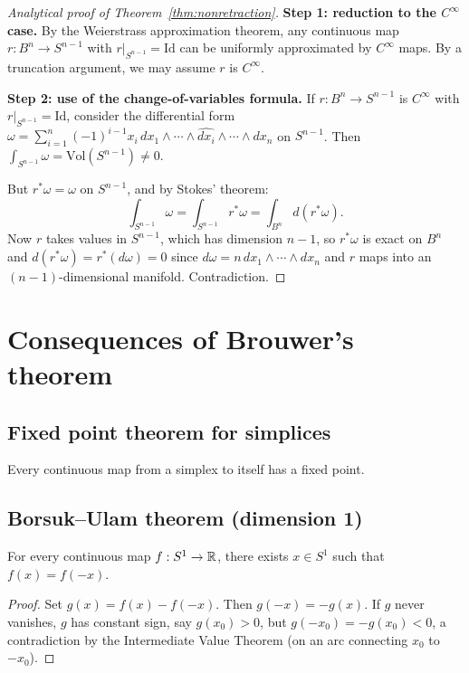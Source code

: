 \begin{proof}[Analytical proof of Theorem~\ref{thm:nonretraction}]
\textbf{Step 1: reduction to the $C^\infty$ case.}
By the Weierstrass approximation theorem, any continuous map
$r : B^n \to S^{n-1}$ with $r|_{S^{n-1}} = \mathrm{Id}$ can be uniformly
approximated by $C^\infty$ maps. By a truncation argument, we may assume $r$ is
$C^\infty$.

\textbf{Step 2: use of the change-of-variables formula.}
If $r : B^n \to S^{n-1}$ is $C^\infty$ with $r|_{S^{n-1}} = \mathrm{Id}$,
consider the differential form $\omega = \sum_{i=1}^n (-1)^{i-1} x_i \,
dx_1 \wedge \cdots \wedge \widehat{dx_i} \wedge \cdots \wedge dx_n$ on
$S^{n-1}$. Then $\int_{S^{n-1}} \omega = \mathrm{Vol}(S^{n-1}) \neq 0$.

But $r^*\omega = \omega$ on $S^{n-1}$, and by Stokes' theorem:
\[
    \int_{S^{n-1}} \omega = \int_{S^{n-1}} r^*\omega = \int_{B^n} d(r^*\omega).
\]
Now $r$ takes values in $S^{n-1}$, which has dimension $n-1$, so $r^*\omega$ is
exact on $B^n$ and $d(r^*\omega) = r^*(d\omega) = 0$ since
$d\omega = n \, dx_1 \wedge \cdots \wedge dx_n$ and $r$ maps into an
$(n-1)$-dimensional manifold. Contradiction.
\end{proof}

\section{Consequences of Brouwer's theorem}

\subsection{Fixed point theorem for simplices}

\begin{corollary}
Every continuous map from a simplex to itself has a fixed point.
\end{corollary}

\subsection{Borsuk--Ulam theorem (dimension 1)}

\begin{theorem}
For every continuous map $f : S^1 \to \mathbb{R}$, there exists $x \in S^1$ such that
$f(x) = f(-x)$.
\end{theorem}

\begin{proof}
Set $g(x) = f(x) - f(-x)$. Then $g(-x) = -g(x)$. If $g$ never vanishes, $g$
has constant sign, say $g(x_0) > 0$, but $g(-x_0) = -g(x_0) < 0$, a
contradiction by the Intermediate Value Theorem (on an arc connecting $x_0$ to
$-x_0$).
\end{proof}


